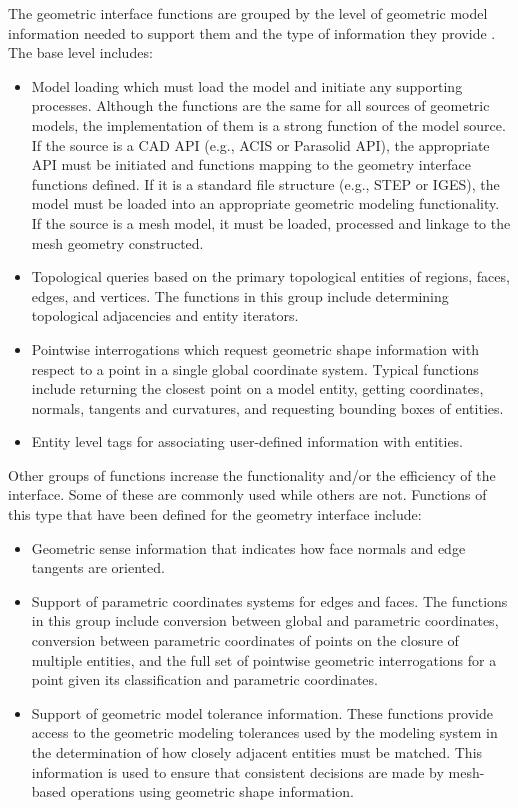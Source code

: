 The geometric interface functions are grouped by the level of
geometric model information needed to support them and the type of
information they provide \cite{TSTT-software}. The base level includes:

\begin{itemize}
\item Model loading which must load the model and initiate any supporting 
processes. Although the functions are the same for all sources of geometric
models, the implementation of them is a strong function of the model
source. If the source is a CAD API (e.g., ACIS or Parasolid API), the
appropriate API must be initiated and functions mapping to the
geometry interface functions defined. If it is a standard file
structure (e.g., STEP or IGES), the model must be loaded into an
appropriate geometric modeling functionality.  If the source is a mesh
model, it must be loaded, processed and linkage to the mesh geometry
constructed.

\item Topological queries based on the primary topological entities of 
regions, faces, edges, and vertices. The functions in this group include determining
topological adjacencies and entity iterators.

\item Pointwise interrogations which request geometric shape information 
with respect to a point in a single global coordinate system. Typical 
functions include returning the closest point on a model entity, 
getting coordinates, normals, tangents
and curvatures, and requesting bounding boxes of entities.

\item Entity level tags for associating user-defined information with entities. 
\end{itemize}

Other groups of functions increase the functionality and/or the
efficiency of the interface.  Some of these are commonly used while
others are not. Functions of this type that have been defined for the
geometry interface include:
\begin{itemize}
\item Geometric sense information that indicates how face normals and edge 
tangents are oriented.
\item Support of parametric coordinates systems for edges and faces. The functions 
in this group include conversion between global and parametric coordinates,
conversion between parametric coordinates of points on the closure of
multiple entities, and the full set of pointwise geometric
interrogations for a point given its classification and parametric
coordinates.
\item Support of geometric model tolerance information. These functions 
provide access to the geometric modeling tolerances used by the modeling system in
the determination of how closely adjacent entities must be
matched. This information is used to ensure that consistent decisions
are made by mesh-based operations using geometric shape information.
\end{itemize}

